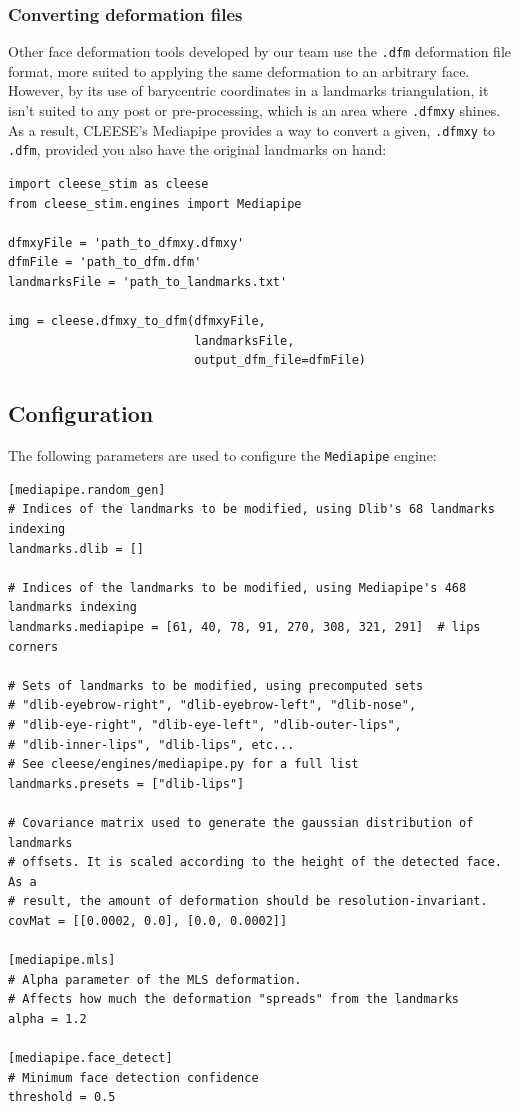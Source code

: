 \documentclass[oneside,10pt]{article}
\begin{document}
\subsubsection{Converting deformation files}

Other face deformation tools developed by our team use the \texttt{.dfm}
deformation file format, more suited to applying the same deformation to an
arbitrary face. However, by its use of barycentric coordinates in a landmarks
triangulation, it isn't suited to any post or pre-processing, which is an area
where \texttt{.dfmxy} shines. As a result, CLEESE's Mediapipe provides a way to
convert a given, \texttt{.dfmxy} to \texttt{.dfm}, provided you also have the
original landmarks on hand:

\vspace{8pt}
\begin{verbatim}
import cleese_stim as cleese
from cleese_stim.engines import Mediapipe

dfmxyFile = 'path_to_dfmxy.dfmxy'
dfmFile = 'path_to_dfm.dfm'
landmarksFile = 'path_to_landmarks.txt'

img = cleese.dfmxy_to_dfm(dfmxyFile,
                          landmarksFile,
                          output_dfm_file=dfmFile)
\end{verbatim}
\vspace{8pt}

\subsection{Configuration}\label{sec:mediapipe:conf}

The following parameters are used to configure the \texttt{Mediapipe} engine:

\vspace{8pt}
\begin{verbatim}
[mediapipe.random_gen]
# Indices of the landmarks to be modified, using Dlib's 68 landmarks indexing
landmarks.dlib = []

# Indices of the landmarks to be modified, using Mediapipe's 468 landmarks indexing
landmarks.mediapipe = [61, 40, 78, 91, 270, 308, 321, 291]  # lips corners

# Sets of landmarks to be modified, using precomputed sets
# "dlib-eyebrow-right", "dlib-eyebrow-left", "dlib-nose",
# "dlib-eye-right", "dlib-eye-left", "dlib-outer-lips",
# "dlib-inner-lips", "dlib-lips", etc...
# See cleese/engines/mediapipe.py for a full list
landmarks.presets = ["dlib-lips"]

# Covariance matrix used to generate the gaussian distribution of landmarks
# offsets. It is scaled according to the height of the detected face. As a
# result, the amount of deformation should be resolution-invariant.
covMat = [[0.0002, 0.0], [0.0, 0.0002]]

[mediapipe.mls]
# Alpha parameter of the MLS deformation.
# Affects how much the deformation "spreads" from the landmarks
alpha = 1.2

[mediapipe.face_detect]
# Minimum face detection confidence
threshold = 0.5
\end{verbatim}
\vspace{8pt}
\end{document}
